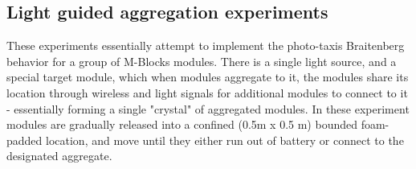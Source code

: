 \subsection{Light guided aggregation experiments}
\label{sec:mblocksExperimentsLight}


These experiments essentially attempt to implement the photo-taxis Braitenberg behavior for a group of M-Blocks modules. There is a single light source, and a special target module, which when modules aggregate to it, the modules share its location through wireless and light signals for additional modules to connect to it - essentially forming a single "crystal" of aggregated modules. In these experiment modules are gradually released into a confined (0.5m x 0.5 m) bounded foam-padded location, and move until they either run out of battery or connect to the designated aggregate.

